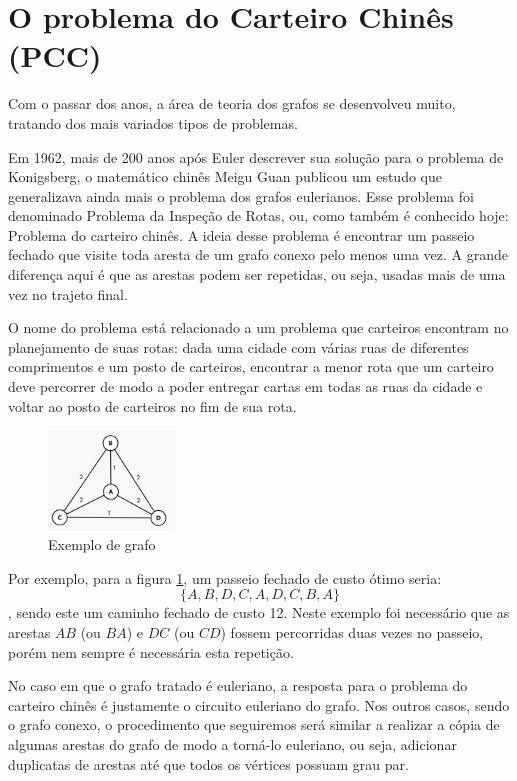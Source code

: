 \documentclass[12pt, a4paper]{article}
\begin{document}
\section{O problema do Carteiro Chinês (PCC)}

Com o passar dos anos, a área de teoria dos grafos se desenvolveu muito, tratando dos mais variados tipos de problemas.

Em 1962, mais de 200 anos após Euler descrever sua solução para o problema de Konigsberg, o matemático chinês Meigu Guan publicou um estudo que generalizava ainda mais o problema dos grafos eulerianos. 
Esse problema foi denominado Problema da Inspeção de Rotas, ou, como também é conhecido hoje: Problema do carteiro chinês.
A ideia desse problema é encontrar um passeio fechado que visite toda aresta de um grafo conexo pelo menos uma vez. 
A grande diferença aqui é que as arestas podem ser repetidas, ou seja, usadas mais de uma vez no trajeto final.

O nome do problema está relacionado a um problema que carteiros encontram no planejamento de suas rotas: dada uma cidade com várias ruas de diferentes comprimentos e um posto de carteiros, encontrar a menor rota que um carteiro deve percorrer de modo a poder entregar cartas em todas as ruas da cidade e voltar ao posto de carteiros no fim de sua rota.

\begin{figure} 
    \centering
    \includegraphics[width=0.3\textwidth]{graph.png}
	\caption{Exemplo de grafo}
	\label{graph}
\end{figure}

Por exemplo, para a figura \ref{graph}, um passeio fechado de custo ótimo seria: \[ \{A, B, D, C, A, D, C, B, A\} \], sendo este um caminho fechado de custo 12.
Neste exemplo foi necessário que as arestas $AB$ (ou $BA$) e $DC$ (ou $CD$) fossem percorridas duas vezes no passeio, porém nem sempre é necessária esta repetição.

No caso em que o grafo tratado é euleriano, a resposta para o problema do carteiro chinês é justamente o circuito euleriano do grafo.
Nos outros casos, sendo o grafo conexo, o procedimento que seguiremos será similar a realizar a cópia de algumas arestas do grafo de modo a torná-lo euleriano, ou seja, adicionar duplicatas de arestas até que todos os vértices possuam grau par.
\end{document}
